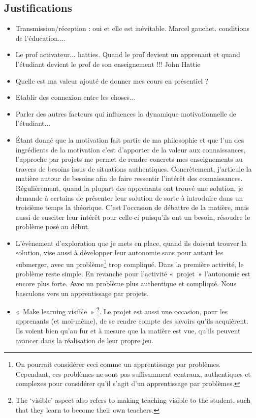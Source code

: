 \subsection{Justifications}
\begin{itemize}
    \item Transmission/réception : oui et elle est inévitable. Marcel gauchet. conditions de l'éducation....
    \item Le prof activateur... hatties. Quand le prof devient un apprenant et quand l'étudiant devient le prof de son enseignement !!! John Hattie
    \item Quelle est ma valeur ajouté de donner mes cours en présentiel ?
    \item Etablir des connexion entre les choses...
    \item Parler des autres facteurs qui influences la dynamique motivationnelle de l'étudiant...
    \item Étant donné que la motivation fait partie de ma philosophie et que l’un des ingrédients de la motivation c’est d’apporter de la valeur aux connaissances\cite{viau1994motivation}, l’approche par projets me permet de rendre concrets mes enseignements au travers de besoins issus de situations authentiques. Concrètement, j'articule la matière autour de besoins afin de faire ressentir l'intérêt des connaissances. Régulièrement, quand la plupart des apprenants ont trouvé une solution, je demande à certains de présenter leur solution de sorte à introduire dans un troisième temps la théorique.  C’est l’occasion de débattre de la matière, mais aussi de susciter leur intérêt pour celle-ci puisqu’ils ont un besoin, résoudre le problème posé au début.
    \item L'évènement d'exploration que je mets en place, quand ils doivent trouver la solution, vise aussi à développer leur autonomie sans pour autant les submerger, avec un problème\footnote{On pourrait considérer ceci comme un apprentissage par problèmes. Cependant, ces problèmes ne sont pas suffisamment centraux, authentiques et complexes pour considérer qu’il s’agit d’un apprentissage par problèmes.} trop compliqué. Dans la première activité, le problème reste simple. En revanche pour l'activité «~projet~» l’autonomie est encore plus forte. Avec un problème plus authentique et compliqué. Nous basculons vers un apprentissage par projets.
    \item «~Make learning visible~» \footnote{The ‘visible’ aspect also refers to making teaching visible to the student, such that they learn to become their own teachers.}\cite{hattie2012visible}. Le projet est aussi une occasion, pour les apprenants (et moi-même), de se rendre compte des savoirs qu'ils acquièrent. Ils voient bien qu'au fur et à mesure que la matière est vue, qu’ils peuvent avancer dans la réalisation de leur propre jeu.

\end{itemize}
